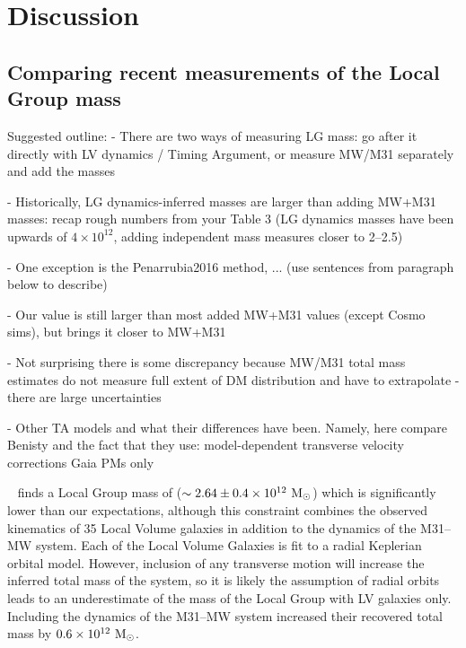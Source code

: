 \documentclass[twocolumn]{aastex631}
\begin{document}
\section{Discussion}
\label{sec:discussion}

\subsection{Comparing recent measurements of the Local Group mass}


Suggested outline:
- There are two ways of measuring LG mass: go after it directly with LV dynamics / Timing Argument, or measure MW/M31 separately and add the masses

- Historically, LG dynamics-inferred masses are larger than adding MW+M31 masses: recap rough numbers from your Table 3 (LG dynamics masses have been upwards of $4\times 10^{12}$, adding independent mass measures closer to 2--2.5)

- One exception is the Penarrubia2016 method, ... (use sentences from paragraph below to describe)

- Our value is still larger than most added MW+M31 values (except Cosmo sims), but brings it closer to MW+M31

- Not surprising there is some discrepancy because MW/M31 total mass estimates do not measure full extent of DM distribution and have to extrapolate - there are large uncertainties

- Other TA models and what their differences have been. Namely, here compare Benisty and the fact that they use: 
model-dependent transverse velocity corrections
Gaia PMs only


~\cite{Penarrubia2016} finds a Local Group mass of ($\sim2.64\pm0.4\times
10^{12}~\mathrm{M}_\odot$) which is significantly lower than our expectations, although this
constraint combines the observed kinematics of 35 Local Volume galaxies in
addition to the dynamics of the M31--MW system.
Each of the Local Volume Galaxies is fit to a radial Keplerian orbital model.
However, inclusion of any transverse motion will increase the inferred total
mass of the system, so it is likely the assumption of radial orbits leads to
an underestimate of the mass of the Local Group with LV galaxies only.
Including the dynamics of the M31--MW system increased their recovered
total mass by $0.6\times10^{12}~\mathrm{M}_\odot$.
\end{document}
